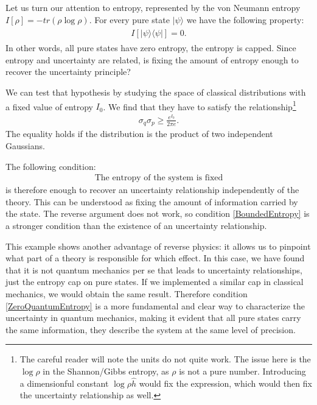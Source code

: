 \documentclass[10pt,twocolumn, nofootinbib]{revtex4-2}
\begin{document}
Let us turn our attention to entropy, represented by the von Neumann entropy $I[\rho] = - tr (\rho \log \rho)$. For every pure state $|\psi \rangle$ we have the following property:
\begin{align}\label{ZeroQuantumEntropy}
	\begin{split}
		I[|\psi\rangle\langle\psi|] = 0.
	\end{split}
\end{align}
In other words, all pure states have zero entropy, the entropy is capped. Since entropy and uncertainty are related, is fixing the amount of entropy enough to recover the uncertainty principle?

We can test that hypothesis by studying the space of classical distributions with a fixed value of entropy $I_0$. We find that they have to satisfy the relationship\footnote{The careful reader will note the units do not quite work. The issue here is the $\log \rho$ in the Shannon/Gibbs entropy, as $\rho$ is not a pure number. Introducing a dimensionful constant $\log \rho \hat{h}$ would fix the expression, which would then fix the uncertainty relationship as well. }
\begin{align}\label{ClassicalUncertaintyPrinciple}
	\sigma_q \sigma_p \geq \frac{e^{I_0}}{2 \pi e}.
\end{align}
The equality holds if the distribution is the product of two independent Gaussians.

The following condition:
\begin{align}\label{BoundedEntropy}
	\text{The entropy of the system is fixed}
\end{align}
is therefore enough to recover an uncertainty relationship independently of the theory. This can be understood as fixing the amount of information carried by the state. The reverse argument does not work, so condition \eqref{BoundedEntropy} is a stronger condition than the existence of an uncertainty relationship.

This example shows another advantage of reverse physics: it allows us to pinpoint what part of a theory is responsible for which effect. In this case, we have found that it is not quantum mechanics per se that leads to uncertainty relationships, just the entropy cap on pure states. If we implemented a similar cap in classical mechanics, we would obtain the same result. Therefore condition \eqref{ZeroQuantumEntropy} is a more fundamental and clear way to characterize the uncertainty in quantum mechanics, making it evident that all pure states carry the same information, they describe the system at the same level of precision.
\end{document}
